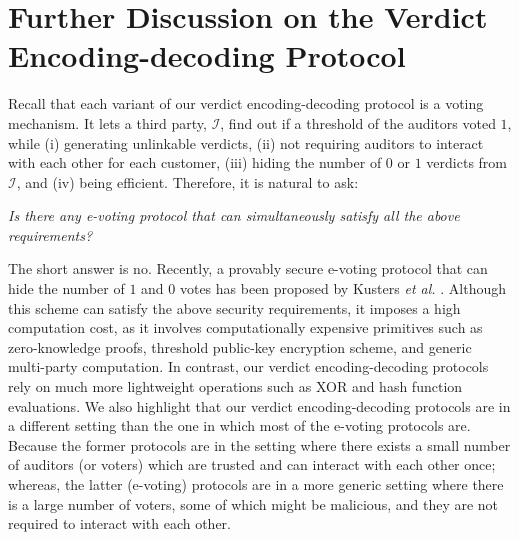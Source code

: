
\section{Further Discussion on the Verdict Encoding-decoding Protocol}\label{sec:: Further-Discussion-on-the-Encoding-decoding-Protocol}




Recall that  each variant of our verdict encoding-decoding protocol is a voting mechanism. It  lets a third party, $\mathcal{I}$, find out if a threshold of the auditors voted $1$, while (i) generating unlinkable verdicts, (ii) not requiring auditors to interact with each other for each customer, (iii) hiding the number of $0$ or $1$ verdicts from  $\mathcal{I}$, and (iv) being  efficient. Therefore, it is natural to ask: 

\begin{center}
\emph{Is there   any {e-voting} protocol that can  simultaneously satisfy all the above requirements?}
\end{center}


The short answer is no. Recently, a provably secure  e-voting protocol that can hide the number of $1$ and $0$ votes has been proposed by K{u}sters \textit{et al.} \cite{KustersL00020}. Although this scheme can satisfy the above security requirements, it imposes a high computation cost, as  it involves computationally expensive primitives such as zero-knowledge proofs, threshold public-key encryption scheme, and generic multi-party computation. In contrast, our verdict encoding-decoding protocols rely on much more lightweight operations such as XOR and hash function evaluations.  We also  highlight that our verdict encoding-decoding protocols are in a different setting than the one in which most of the e-voting protocols are. Because the former protocols are in the setting where there exists a small number of auditors (or voters) which are trusted and can interact with each other once; whereas, the latter (e-voting) protocols are in a more   generic setting where there is a large number of  voters, some of which might be malicious, and they are not   required to interact with each other. 


